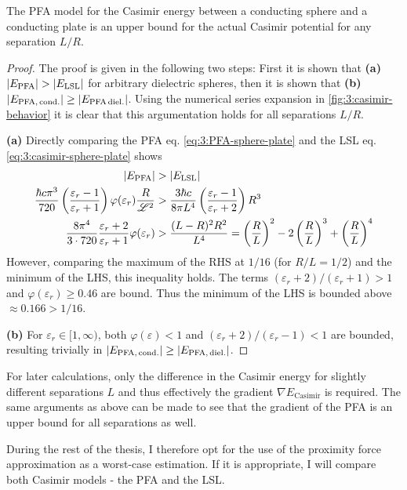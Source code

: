 \begin{theorem}
  The PFA model for the Casimir energy between a conducting sphere and a conducting plate is an upper bound for the actual Casimir potential for any separation $L/R$.
\end{theorem}
\begin{proof}
  The proof is given in the following two steps: First it is shown that \textbf{(a)} $\left\lvert E_\mathrm{PFA}\right\rvert > \left\lvert E_\mathrm{LSL}\right\rvert$ for arbitrary dielectric spheres, then it is shown that \textbf{(b)} $\left\lvert E_\mathrm{PFA,\,cond.}\right\rvert \geq \left\lvert E_\mathrm{PFA\,diel.}\right\rvert$. Using the numerical series expansion in \cref{fig:3:casimir-behavior} it is clear that this argumentation holds for all separations $L/R$.
  
  \textbf{(a)} Directly comparing the PFA eq. \eqref{eq:3:PFA-sphere-plate} and the LSL eq. \eqref{eq:3:casimir-sphere-plate} shows
  \begin{align}
    \left\lvert E_\mathrm{PFA}\right\rvert &> \left\lvert E_\mathrm{LSL}\right\rvert\\
    \frac{\hbar c \pi^3}{720} \left(\frac{\varepsilon_r - 1}{\varepsilon_r + 1}\right)\varphi(\varepsilon_r) \frac{R}{\mathscr{L}^2} &> \frac{3\hbar c}{8 \pi L^4}\left(\frac{\varepsilon_r - 1}{\varepsilon_r + 2}\right) R^3 \\
    \frac{8 \pi^4}{3 \cdot 720} \frac{\varepsilon_r + 2}{\varepsilon_r + 1} \varphi(\varepsilon_r) &> \frac{(L-R)^2 R^2}{L^4} = \left(\frac{R}{L}\right)^2 - 2\left(\frac{R}{L}\right)^3 + \left(\frac{R}{L}\right)^4
  \end{align}
  However, comparing the maximum of the RHS at $1/16$ (for $R/L = 1/2$) and the minimum of the LHS, this inequality holds. The terms $(\varepsilon_r + 2)/(\varepsilon_r + 1) > 1$ and $\varphi(\varepsilon_r) \geq 0.46$ are bound. Thus the minimum of the LHS is bounded above $\approx 0.166 > 1/16$.

  \textbf{(b)} For $\varepsilon_r \in [1,\infty)$, both $\varphi(\varepsilon) < 1$ and $(\varepsilon_r + 2)/(\varepsilon_r - 1) < 1$ are bounded, resulting trivially in $\left\lvert E_\mathrm{PFA,\,cond.}\right\rvert \geq \left\lvert E_\mathrm{PFA,\,diel.}\right\rvert$.
\end{proof}
\begin{remark}
  For later calculations, only the difference in the Casimir energy for slightly different separations $L$ and thus effectively the gradient $\nabla E_\mathrm{Casimir}$ is required. The same arguments as above can be made to see that the gradient of the PFA is an upper bound for all separations as well.
\end{remark}
During the rest of the thesis, I therefore opt for the use of the proximity force approximation as a worst-case estimation. If it is appropriate, I will compare both Casimir models - the PFA and the LSL.